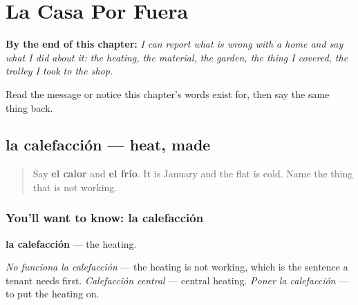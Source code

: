 
\chapter{La Casa Por Fuera}
\label{ch:es-casa-fuera}

\begin{chapteropening}
\textbf{By the end of this chapter:} \emph{I can report what is wrong with a home and say what I did about it: the heating, the material, the garden, the thing I covered, the trolley I took to the shop.}

Read the message or notice this chapter's words exist for, then say the same thing back.
\end{chapteropening}

\section[la calefacción]{la calefacción — heat, made}

\label{lesson:ES-C444-calefaccion}



\begin{quote}
Say \textbf{el calor} and \textbf{el frío}. It is January and the flat is cold. Name the thing that is not working.
\end{quote}

\subsection*{You'll want to know: la calefacción}
\textbf{la calefacción} — the heating.

\emph{No funciona la calefacción} — the heating is not working, which is the sentence a tenant needs first. \emph{Calefacción central} — central heating. \emph{Poner la calefacción} — to put the heating on.

